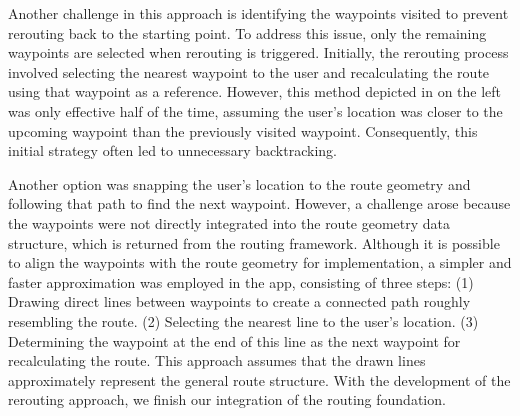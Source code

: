 Another challenge in this approach is identifying the waypoints visited to prevent rerouting back to the starting point. To address this issue, only the remaining waypoints are selected when rerouting is triggered. Initially, the rerouting process involved selecting the nearest waypoint to the user and recalculating the route using that waypoint as a reference. However, this method depicted in  on the left was only effective half of the time, assuming the user's location was closer to the upcoming waypoint than the previously visited waypoint. Consequently, this initial strategy often led to unnecessary backtracking.

Another option was snapping the user's location to the route geometry and following that path to find the next waypoint. However, a challenge arose because the waypoints were not directly integrated into the route geometry data structure, which is returned from the routing framework. Although it is possible to align the waypoints with the route geometry for implementation, a simpler and faster approximation was employed in the app, consisting of three steps: (1) Drawing direct lines between waypoints to create a connected path roughly resembling the route. (2) Selecting the nearest line to the user's location. (3) Determining the waypoint at the end of this line as the next waypoint for recalculating the route. This approach assumes that the drawn lines approximately represent the general route structure. With the development of the rerouting approach, we finish our integration of the routing foundation.

